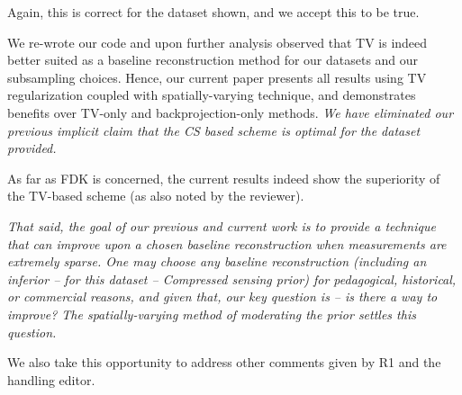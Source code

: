 \documentclass{article}
\begin{document}
Again, this is correct for the dataset shown, and we accept this to be
true.

  We re-wrote our code and upon further analysis observed that TV is
  indeed better suited as a baseline reconstruction method for our
  datasets and our subsampling choices. Hence, our current paper
  presents all results using TV regularization coupled with
  spatially-varying technique, and demonstrates  benefits over
  TV-only and backprojection-only methods.  \emph{We have eliminated our
  previous implicit claim that the CS based scheme is optimal for the
  dataset provided. }

  As far as FDK is concerned, the current results indeed show the
  superiority of the TV-based scheme (as also noted by the reviewer).

    \textit{That said, the goal of our previous and current work is to provide
    a technique that can improve upon a chosen baseline reconstruction
    when measurements are extremely sparse.  One may choose any
    baseline reconstruction (including an inferior -- for this dataset
    -- Compressed sensing prior) for pedagogical, historical, or
    commercial reasons, and given that, our key question is -- is
    there a way to improve?  The spatially-varying method of
    moderating the prior settles this question.}

We also take this opportunity to address other comments given by R1
and the handling editor.
\end{document}
